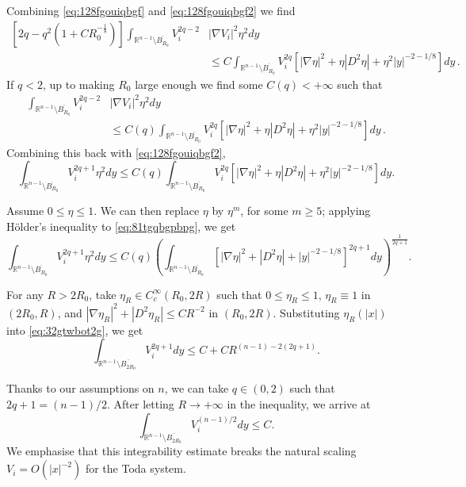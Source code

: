 \documentclass{article}
\newcommand{\R}{\mathbb{R}}
\theoremstyle{definition}
\begin{document}
Combining \eqref{eq:128fgouiqbgf} and \eqref{eq:128fgouiqbgf2} we find
\begin{align*}
\left[2q-q^2 \left(1 + C R_0^{-\frac{1}{8}} \right)\right] \int_{\R^{n-1}\setminus \overline{B_{R_0}}} V_i^{2q - 2} &|\nabla V_i|^2 \eta^2  dy\\
&\leq C \int_{\R^{n-1}\setminus \overline{B_{R_0}}} V_i^{2q} \left[ |\nabla \eta|^2 + \eta |D^2 \eta| + \eta^2 |y|^{-2 - 1/8} \right] dy\,.
\end{align*}
If $q < 2$, up to making $R_0$ large enough we find some $C(q) < +\infty$ such that
\begin{align*}
\int_{\R^{n-1}\setminus \overline{B_{R_0}}} V_i^{2q - 2} &|\nabla V_i|^2 \eta^2  dy\\
&\leq C(q) \int_{\R^{n-1}\setminus \overline{B_{R_0}}} V_i^{2q} \left[ |\nabla \eta|^2 + \eta |D^2 \eta| + \eta^2 |y|^{-2 - 1/8} \right] dy\,.
\end{align*}
Combining this back with \eqref{eq:128fgouiqbgf2},
\begin{equation}\label{eq:81tgqbgpbpg}
\int_{\R^{n-1}\setminus \overline{B_{R_0}}} V_i^{2q + 1} \eta^2  dy \leq C(q) \int_{\R^{n-1}\setminus \overline{B_{R_0}}} V_i^{2q} \left[ |\nabla \eta|^2 + \eta |D^2 \eta| + \eta^2 |y|^{-2 - 1/8} \right]  dy.
\end{equation}

Assume $0 \leq \eta \leq 1$. We can then replace $\eta$ by $\eta^m$, for some $m \geq 5$; applying Hölder's inequality to \eqref{eq:81tgqbgpbpg}, we get
\begin{equation}\label{eq:32gtwbot2g}
\int_{\R^{n-1}\setminus \overline{B_{R_0}}} V_i^{2q + 1} \eta^2 dy \leq C(q) \left( \int_{\R^{n-1}\setminus \overline{B_{R_0}}} \left[|\nabla \eta|^2 + |D^2 \eta| + |y|^{-2 - 1/8} \right]^{2q + 1} dy \right)^{\frac{1}{2q + 1}}.
\end{equation}

For any $R > 2R_0$, take $\eta_R \in C_c^\infty(R_0, 2R)$ such that $0 \leq \eta_R \leq 1$, $\eta_R \equiv 1$ in $(2R_0, R)$, and $|\nabla \eta_R|^2 + |D^2 \eta_R| \leq C R^{-2}$ in $(R_0, 2R)$. Substituting $\eta_R(|x|)$ into \eqref{eq:32gtwbot2g}, we get
\begin{equation*}
\int_{\R^{n-1}\setminus \overline{B_{2R_0}}} V_i^{2q + 1} dy \leq C + C R^{(n-1) - 2(2q + 1)}.
\end{equation*}

Thanks to our assumptions on $n$, we can take $q\in(0,2)$ such that $2q + 1 = (n-1)/2$. After letting $R \to +\infty$ in the inequality, we arrive at
\begin{equation*}
\int_{\R^{n-1}\setminus \overline{B_{2R_0}}} V_i^{(n-1)/2} dy \leq C.
\end{equation*}
We emphasise that this integrability estimate breaks the natural scaling $V_i=O(|x|^{-2})$ for the Toda system.
\end{document}
